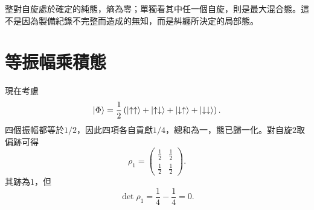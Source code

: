 整對自旋處於確定的純態，熵為零；單獨看其中任一個自旋，則是最大混合態。這不是因為製備紀錄不完整而造成的無知，而是糾纏所決定的局部態。

\section{等振幅乘積態}

現在考慮
\begin{equation}
\left\lvert\Phi\right\rangle
=\frac12\left(
\left\lvert\uparrow\uparrow\right\rangle
+\left\lvert\uparrow\downarrow\right\rangle
+\left\lvert\downarrow\uparrow\right\rangle
+\left\lvert\downarrow\downarrow\right\rangle
\right).
\end{equation}
四個振幅都等於\(1/2\)，因此四項各自貢獻\(1/4\)，總和為一，態已歸一化。對自旋\(2\)取偏跡可得
\begin{equation}
\rho_1
=
\begin{pmatrix}
\frac12&\frac12\\[2pt]
\frac12&\frac12
\end{pmatrix}.
\end{equation}
其跡為\(1\)，但
\begin{equation}
\det\rho_1
=\frac14-\frac14
=0.
\end{equation}

\begin{classroomqa}
\end{classroomqa}

\begin{classroomqa}
\end{classroomqa}

